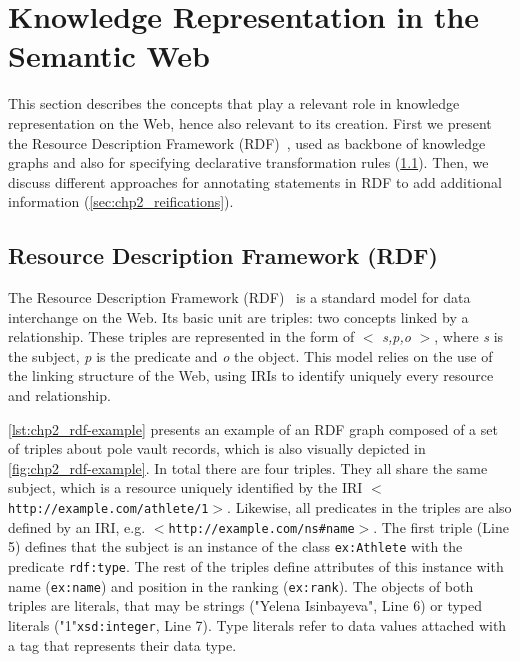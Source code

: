 \section{Knowledge Representation in the Semantic Web}
\label{sec:chp2_semweb}

This section describes the concepts that play a relevant role in knowledge representation on the Web, hence also relevant to its creation. First we present the Resource Description Framework (RDF)~\parencite{rdf}, used as backbone of knowledge graphs and also for specifying declarative transformation rules (\cref{sec:chp2_rdf}). Then, we discuss different approaches for annotating statements in RDF to add additional information (\cref{sec:chp2_reifications}).

\subsection{Resource Description Framework (RDF)}
\label{sec:chp2_rdf}

The Resource Description Framework (RDF)~\parencite{rdf} is a standard model for data interchange on the Web. Its basic unit are triples: two concepts linked by a relationship. These triples are represented in the form of $<$ \textit{s,p,o} $>$, where \textit{s} is the subject, \textit{p} is the predicate and \textit{o} the object. This model relies on the use of the linking structure of the Web, using IRIs to identify uniquely every resource and relationship. 

\cref{lst:chp2_rdf-example} presents an example of an RDF graph composed of a set of triples about pole vault records, which is also visually depicted in \cref{fig:chp2_rdf-example}. In total there are four triples. They all share the same subject, which is a resource uniquely identified by the IRI $<$\texttt{http://example.com/athlete/1}$>$. Likewise, all predicates in the triples are also defined by an IRI, e.g. $<$\texttt{http://example.com/ns\#name}$>$. The first triple (Line 5) defines that the subject is an instance of the class \texttt{ex:Athlete} with the predicate \texttt{rdf:type}. The rest of the triples define attributes of this instance with name (\texttt{ex:name}) and position in the ranking (\texttt{ex:rank}). The objects of both triples are literals, that may be strings ("Yelena Isinbayeva", Line 6) or typed literals ("1"\scalebox{.8}{\textsuperscript{$\wedge\wedge$}}\texttt{xsd:integer}, Line 7). Type literals refer to data values attached with a tag that represents their data type.

